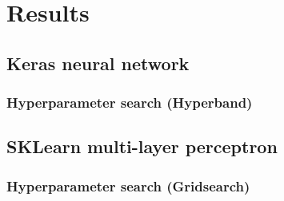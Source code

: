 \chapter{Results}
\section{Keras neural network}
\subsection{Hyperparameter search (Hyperband)}

\section{SKLearn multi-layer perceptron}
\subsection{Hyperparameter search (Gridsearch)}